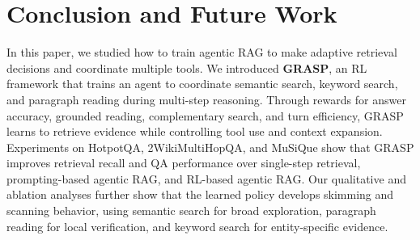 \documentclass[11pt]{article}
\begin{document}
\section{Conclusion and Future Work}
\label{sec:conclusion}



In this paper, we studied how to train agentic RAG to make adaptive retrieval decisions and coordinate multiple tools. We introduced \textbf{GRASP}, an RL framework that trains an agent to coordinate semantic search, keyword search, and paragraph reading during multi-step reasoning. Through rewards for answer accuracy, grounded reading, complementary search, and turn efficiency, GRASP learns to retrieve evidence while controlling tool use and context expansion. Experiments on HotpotQA, 2WikiMultiHopQA, and MuSiQue show that GRASP improves retrieval recall and QA performance over single-step retrieval, prompting-based agentic RAG, and RL-based agentic RAG. Our qualitative and ablation analyses further show that the learned policy develops skimming and scanning behavior, using semantic search for broad exploration, paragraph reading for local verification, and keyword search for entity-specific evidence.
\end{document}
